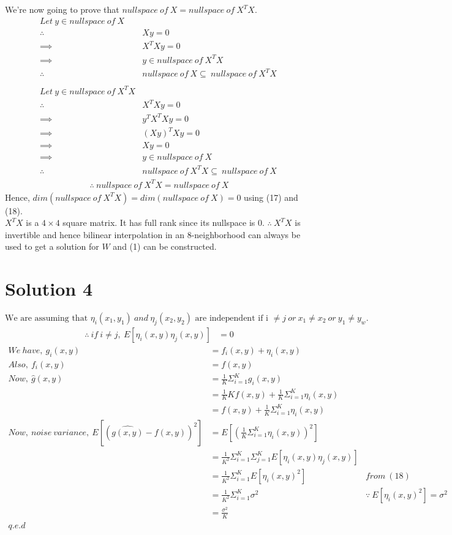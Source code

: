 \documentclass[a4paper,fleqn,11pt]{article}
\theoremstyle{mytheor}
\begin{document}
We're now going to prove that $nullspace\ of\ X = nullspace\ of\ X^TX$.
\begin{align*}
Let\ y \in nullspace\ of\ X \\
\therefore\ & Xy = 0 \\
\implies\ & X^TXy = 0 \\
\implies\ & y \in nullspace\ of\ X^TX \\
\therefore\ & nullspace\ of\ X \subseteq\ nullspace\ of\ X^TX \\
\\
Let\ y \in nullspace\ of\ X^TX \\
\therefore\ & X^TXy = 0 \\
\implies\ & y^TX^TXy = 0 \\
\implies\ & (Xy)^TXy = 0 \\
\implies\ & Xy = 0 \\
\implies\ & y \in nullspace\ of\ X \\
\therefore\ & nullspace\ of\ X^TX \subseteq\ nullspace\ of\ X\
\end{align*}
\begin{align}
\therefore\ nullspace\ of\ X^TX = nullspace\ of\ X
\end{align}
Hence, $dim(nullspace\ of\ X^TX) = dim(nullspace\ of\ X) = 0$ using (17) and (18). \\
$X^TX$ is a $4\times4$ square matrix. It has full rank since its nullspace is 0. $\therefore\ X^TX$ is invertible and hence bilinear interpolation in an 8-neighborhood can always be used to get a solution for $W$ and (1) can be constructed.
\section*{Solution 4}
$$\text{We are assuming that }\eta_i (x_1, y_1)\ and\ \eta_j (x_2, y_2)\text{ are independent if i }\neq j\ or\ x_1 \neq x_2\ or\ y_1 \neq y_w.$$
\begin{align}
\therefore\ if\ i \neq j,\ E[\eta_i(x, y)\eta_j(x, y)] & = 0
\end{align}
\begin{align*}
We\ have,\ g_i(x, y) & = f_i(x, y) + \eta_i(x, y) \\
Also,\ f_i(x, y) & = f(x, y) \\
Now,\ \hat{g}(x, y)& = \frac{1}{K} \Sigma_{i = 1}^K g_i(x, y) \\
& = \frac{1}{K}K f(x, y) + \frac{1}{K}\Sigma_{i = 1}^K \eta_i(x, y) \\
& = f(x, y) + \frac{1}{K}\Sigma_{i = 1}^K \eta_i(x, y) \\
Now,\ noise\ variance,\ E[(\hat{g(x, y)} - f(x, y))^2] & = E[(\frac{1}{K}\Sigma_{i = 1}^K \eta_i(x, y))^2] \\
& = \frac{1}{K^2}\Sigma_{i = 1}^K\Sigma_{j = 1}^K E[\eta_i(x, y)\eta_j(x, y)] \\
& = \frac{1}{K^2}\Sigma_{i = 1}^K E[\eta_i(x, y)^2] & from\ (18) \\
& = \frac{1}{K^2}\Sigma_{i = 1}^K \sigma^2 & \because\ E[\eta_i(x, y)^2] = \sigma^2 \\
& = \frac{\sigma^2}{K} \\
q.e.d
\end{align*}
\end{document}

